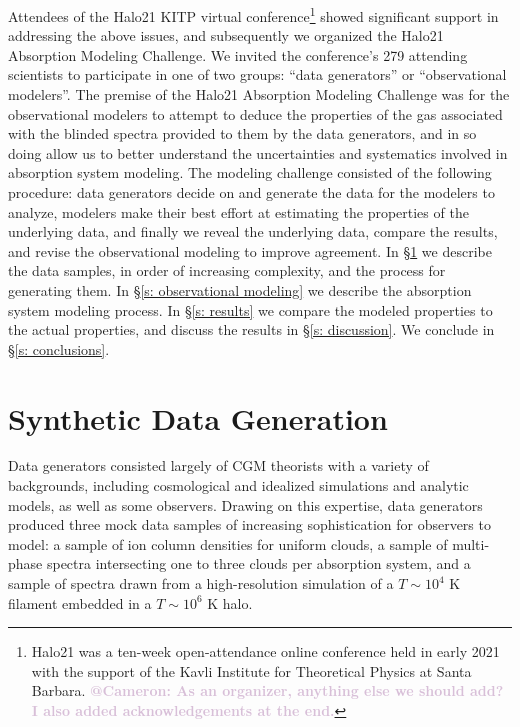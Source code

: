 \documentclass[fleqn,usenatbib]{mnras}
\makeatletter
\newcommand{\atcameron}[1]{\textcolor{Thistle}{\textbf{@Cameron: #1}}}
\makeatother
\begin{document}
Attendees of the Halo21 KITP virtual conference\footnote{Halo21 was a ten-week open-attendance online conference held in early 2021 with the support of the Kavli Institute for Theoretical Physics at Santa Barbara. \atcameron{As an organizer, anything else we should add? I also added acknowledgements at the end.}} showed significant support in addressing the above issues, and subsequently we organized the Halo21 Absorption Modeling Challenge.
We invited the conference's 279 attending scientists to participate in one of two groups: ``data generators'' or ``observational modelers''.
The premise of the Halo21 Absorption Modeling Challenge was for the observational modelers to attempt to deduce the properties of the gas associated with the blinded spectra provided to them by the data generators, and in so doing allow us to better understand the uncertainties and systematics involved in absorption system modeling.
The modeling challenge consisted of the following procedure:
data generators decide on and generate the data for the modelers to analyze, modelers make their best effort at estimating the properties of the underlying data, and finally we reveal the underlying data, compare the results, and revise the observational modeling to improve agreement.
In \S\ref{s: data generation} we describe the data samples, in order of increasing complexity, and the process for generating them.
In \S\ref{s: observational modeling} we describe the absorption system modeling process.
In \S\ref{s: results} we compare the modeled properties to the actual properties, and discuss the results in \S\ref{s: discussion}.
We conclude in \S\ref{s: conclusions}.

\section{Synthetic Data Generation}
\label{s: data generation}

Data generators consisted largely of CGM theorists with a variety of backgrounds, including cosmological and idealized simulations and analytic models, as well as some observers.
Drawing on this expertise, data generators produced three mock data samples of increasing sophistication for observers to model:
a sample of ion column densities for uniform clouds,
a sample of multi-phase spectra intersecting one to three clouds per absorption system,
and a sample of spectra drawn from a high-resolution simulation of a $T \sim 10^4$ K filament embedded in a $T \sim 10^6$ K halo.
\end{document}
